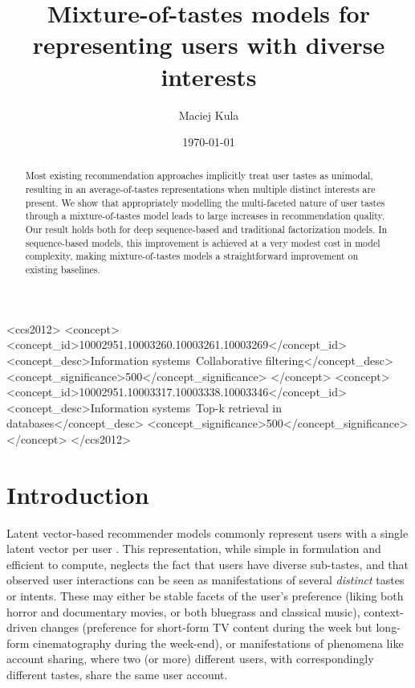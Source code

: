 \documentclass[sigconf]{acmart}
\begin{document}
\title{Mixture-of-tastes models for representing users with diverse interests}
\author{Maciej Kula}
\date{\today}
\acmConference[]{}{}{}

\begin{CCSXML}
<ccs2012>
<concept>
<concept_id>10002951.10003260.10003261.10003269</concept_id>
<concept_desc>Information systems~Collaborative filtering</concept_desc>
<concept_significance>500</concept_significance>
</concept>
<concept>
<concept_id>10002951.10003317.10003338.10003346</concept_id>
<concept_desc>Information systems~Top-k retrieval in databases</concept_desc>
<concept_significance>500</concept_significance>
</concept>
</ccs2012>
\end{CCSXML}




\begin{abstract}
Most existing recommendation approaches implicitly treat user tastes as unimodal, resulting in an average-of-tastes representations when multiple distinct interests are present. We show that appropriately modelling the multi-faceted nature of user tastes through a mixture-of-tastes model leads to large increases in recommendation quality. Our result holds both for deep sequence-based and traditional factorization models. In sequence-based models, this improvement is achieved at a very modest cost in model complexity, making mixture-of-tastes models a straightforward improvement on existing baselines.
\end{abstract}

\maketitle


\section{Introduction}
Latent vector-based recommender models commonly represent users with a single latent vector per user \citep{koren2009bellkor, hu2008collaborative}. This representation, while simple in formulation and efficient to compute, neglects the fact that users have diverse sub-tastes, and that observed user interactions can be seen as manifestations of several \emph{distinct} tastes or intents. These may either be stable facets of the user's preference (liking both horror and documentary movies, or both bluegrass and classical music), context-driven changes (preference for short-form TV content during the week but long-form cinematography during the week-end), or manifestations of phenomena like account sharing, where two (or more) different users, with correspondingly different tastes, share the same user account.
\end{document}
